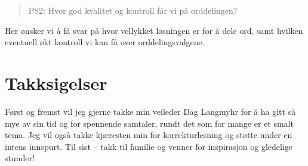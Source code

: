 \begin{quote}
PS2: Hvor god kvalitet og kontroll får vi på orddelingen?
\end{quote}

Her ønsker vi å få svar på hvor vellykket løsningen er for å dele ord, samt hvilken eventuell økt kontroll vi kan få over orddelingsvalgene.

\section*{Takksigelser}

Først og fremst vil jeg gjerne takke min veileder Dag Langmyhr for å ha gitt så mye av sin tid og for spennende samtaler, rundt det som for mange er et smalt tema. Jeg vil også takke kjæresten min for korrekturlesning og støtte under en intens innspurt. Til sist -- takk til familie og venner for inspirasjon og gledelige stunder!